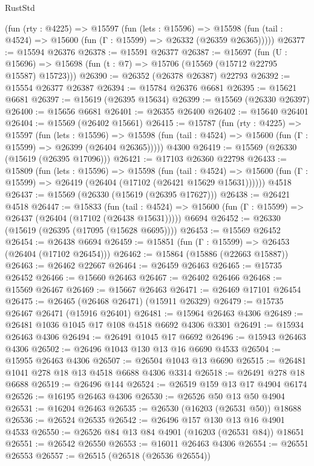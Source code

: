 \begin{lexlean}{RustStd}
\begin{coremodule}
    (fun (rty : @4225) =>
    @15597
      (fun (lets : @15596) =>
      @15598 (fun (tail : @4524) => @15600 (fun (Γ : @15599) => @26332 (@26359 @26365)))))
@26377 := @15594 @26376
@26378 := @15591 @26377
@26387 := @15697
    (fun (U : @15696) => @15698 (fun (t : @7) => @15706 (@15569 (@15712 @22795 @15587) @15723)))
@26390 := @26352 (@26378 @26387) @22793
@26392 := @15554 @26377 @26387
@26394 := @15784 @26376 @6681
@26395 := @15621 @6681
@26397 := @15619 (@26395 @15634)
@26399 := @15569 (@26330 @26397)
@26400 := @15656 @6681
@26401 := @26355 @26400
@26402 := @15640 @26401
@26404 := @15569 (@26402 @15661)
@26415 := @15787
    (fun (rty : @4225) =>
    @15597
      (fun (lets : @15596) =>
      @15598 (fun (tail : @4524) => @15600 (fun (Γ : @15599) => @26399 (@26404 @26365)))))
    @4300
@26419 := @15569 (@26330 (@15619 (@26395 @17096)))
@26421 := @17103 @26360 @22798
@26433 := @15809
    (fun (lets : @15596) =>
    @15598
      (fun (tail : @4524) =>
      @15600 (fun (Γ : @15599) => @26419 (@26404 (@17102 (@26421 @15629 @15631))))))
    @4518
@26437 := @15569 (@26330 (@15619 (@26395 @17627)))
@26438 := @26421 @4518
@26447 := @15833
    (fun (tail : @4524) => @15600 (fun (Γ : @15599) => @26437 (@26404 (@17102 (@26438 @15631)))))
    @6694
@26452 := @26330 (@15619 (@26395 (@17095 (@15628 @6695))))
@26453 := @15569 @26452
@26454 := @26438 @6694
@26459 := @15851 (fun (Γ : @15599) => @26453 (@26404 (@17102 @26454)))
@26462 := @15864 (@15886 (@22663 @15887))
@26463 := @26462 @22667
@26464 := @26459 @26463
@26465 := @15735 @26452
@26466 := @15660 @26463
@26467 := @26402 @26466
@26468 := @15569 @26467
@26469 := @15667 @26463
@26471 := @26469 @17101 @26454
@26475 := @26465 (@26468 @26471) (@15911 @26329)
@26479 := @15735 @26467 @26471 (@15916 @26401)
@26481 := @15964 @26463 @4306
@26489 := @26481 @1036 @1045 @17 @108 @4518 @6692 @4306 @3301
@26491 := @15934 @26463 @4306
@26494 := @26491 @1045 @17 @6692
@26496 := @15943 @26463 @4306
@26502 := @26496 @1043 @130 @13 @16 @6690 @4533
@26504 := @15955 @26463 @4306
@26507 := @26504 @1043 @13 @6690
@26515 := @26481 @1041 @278 @18 @13 @4518 @6688 @4306 @3314
@26518 := @26491 @278 @18 @6688
@26519 := @26496 @144
@26524 := @26519 @159 @13 @17 @4904 @6174
@26526 := @16195 @26463 @4306
@26530 := @26526 @50 @13 @50 @4904
@26531 := @16204 @26463
@26535 := @26530 (@16203 (@26531 @50)) @18688
@26536 := @26524 @26535
@26542 := @26496 @157 @130 @13 @16 @4901 @4533
@26550 := @26526 @84 @13 @84 @4901 (@16203 (@26531 @84)) @18651
@26551 := @26542 @26550
@26553 := @16011 @26463 @4306
@26554 := @26551 @26553
@26557 := @26515 (@26518 (@26536 @26554))

\end{coremodule}
\end{lexlean}
